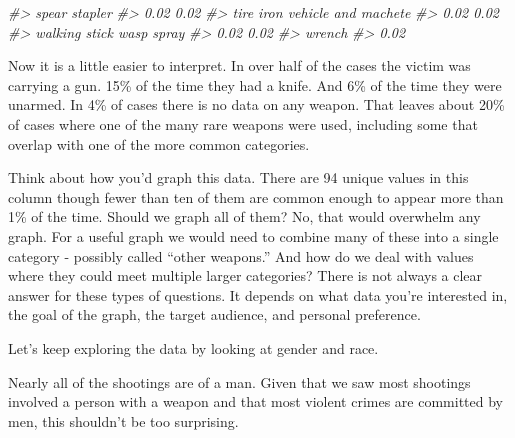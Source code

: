 \documentclass[
  12pt,
]{book}
\newenvironment{Shaded}{\begin{snugshade}}{\end{snugshade}}
\newcommand{\CommentTok}[1]{\textcolor[rgb]{0.56,0.35,0.01}{\textit{#1}}}
\newcommand{\DecValTok}[1]{\textcolor[rgb]{0.00,0.00,0.81}{#1}}
\newcommand{\KeywordTok}[1]{\textcolor[rgb]{0.13,0.29,0.53}{\textbf{#1}}}
\newcommand{\NormalTok}[1]{#1}
\newcommand{\OperatorTok}[1]{\textcolor[rgb]{0.81,0.36,0.00}{\textbf{#1}}}
\newcommand{\StringTok}[1]{\textcolor[rgb]{0.31,0.60,0.02}{#1}}
\begin{document}
\begin{Shaded}
\begin{Highlighting}[]
\CommentTok{\#>                            spear                          stapler }
\CommentTok{\#>                             0.02                             0.02 }
\CommentTok{\#>                        tire iron              vehicle and machete }
\CommentTok{\#>                             0.02                             0.02 }
\CommentTok{\#>                    walking stick                       wasp spray }
\CommentTok{\#>                             0.02                             0.02 }
\CommentTok{\#>                           wrench }
\CommentTok{\#>                             0.02}
\end{Highlighting}
\end{Shaded}

Now it is a little easier to interpret. In over half of the cases the victim was carrying a gun. 15\% of the time they had a knife. And 6\% of the time they were unarmed. In 4\% of cases there is no data on any weapon. That leaves about 20\% of cases where one of the many rare weapons were used, including some that overlap with one of the more common categories.

Think about how you'd graph this data. There are 94 unique values in this column though fewer than ten of them are common enough to appear more than 1\% of the time. Should we graph all of them? No, that would overwhelm any graph. For a useful graph we would need to combine many of these into a single category - possibly called ``other weapons.'' And how do we deal with values where they could meet multiple larger categories? There is not always a clear answer for these types of questions. It depends on what data you're interested in, the goal of the graph, the target audience, and personal preference.

Let's keep exploring the data by looking at gender and race.

\begin{Shaded}
\end{Shaded}

Nearly all of the shootings are of a man. Given that we saw most shootings involved a person with a weapon and that most violent crimes are committed by men, this shouldn't be too surprising.
\end{document}
